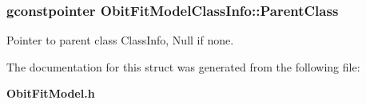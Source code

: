 \subsubsection{\setlength{\rightskip}{0pt plus 5cm}gconstpointer {\bf Obit\-Fit\-Model\-Class\-Info::Parent\-Class}}\label{structObitFitModelClassInfo_o3}


Pointer to parent class Class\-Info, Null if none. 



The documentation for this struct was generated from the following file:\begin{CompactItemize}
\item 
{\bf Obit\-Fit\-Model.h}\end{CompactItemize}
